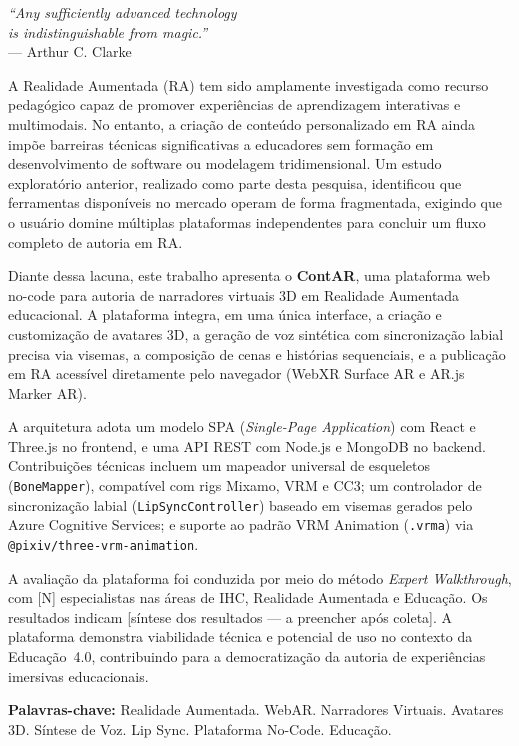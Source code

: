 \documentclass[
  12pt,
  openright,
  twoside,
  a4paper,
  english,
  brazil
]{abntex2}
\begin{document}
\begin{epigrafe}
  \vspace*{\fill}
  \begin{flushright}
    \textit{``Any sufficiently advanced technology\\
    is indistinguishable from magic.''}\\
    --- Arthur C. Clarke
  \end{flushright}
\end{epigrafe}

\begin{resumo}
  A Realidade Aumentada (RA) tem sido amplamente investigada como recurso
  pedagógico capaz de promover experiências de aprendizagem interativas e
  multimodais. No entanto, a criação de conteúdo personalizado em RA ainda
  impõe barreiras técnicas significativas a educadores sem formação em
  desenvolvimento de software ou modelagem tridimensional. Um estudo
  exploratório anterior, realizado como parte desta pesquisa, identificou
  que ferramentas disponíveis no mercado operam de forma fragmentada,
  exigindo que o usuário domine múltiplas plataformas independentes para
  concluir um fluxo completo de autoria em RA.

  Diante dessa lacuna, este trabalho apresenta o \textbf{ContAR}, uma
  plataforma web no-code para autoria de narradores virtuais 3D em Realidade
  Aumentada educacional. A plataforma integra, em uma única interface, a
  criação e customização de avatares 3D, a geração de voz sintética com
  sincronização labial precisa via visemas, a composição de cenas e histórias
  sequenciais, e a publicação em RA acessível diretamente pelo navegador
  (WebXR Surface AR e AR.js Marker AR).

  A arquitetura adota um modelo SPA (\textit{Single-Page Application}) com
  React e Three.js no frontend, e uma API REST com Node.js e MongoDB no
  backend. Contribuições técnicas incluem um mapeador universal de esqueletos
  (\texttt{BoneMapper}), compatível com rigs Mixamo, VRM e CC3; um controlador
  de sincronização labial (\texttt{LipSyncController}) baseado em visemas
  gerados pelo Azure Cognitive Services; e suporte ao padrão VRM Animation
  (\texttt{.vrma}) via \texttt{@pixiv/three-vrm-animation}.

  A avaliação da plataforma foi conduzida por meio do método
  \textit{Expert Walkthrough}, com [N] especialistas nas áreas de IHC,
  Realidade Aumentada e Educação. Os resultados indicam [síntese dos
  resultados — a preencher após coleta]. A plataforma demonstra viabilidade
  técnica e potencial de uso no contexto da Educação~4.0, contribuindo para
  a democratização da autoria de experiências imersivas educacionais.

  \vspace{\onelineskip}
  \noindent\textbf{Palavras-chave:}
  Realidade Aumentada.
  WebAR.
  Narradores Virtuais.
  Avatares 3D.
  Síntese de Voz.
  Lip Sync.
  Plataforma No-Code.
  Educação.
\end{resumo}
\end{document}
